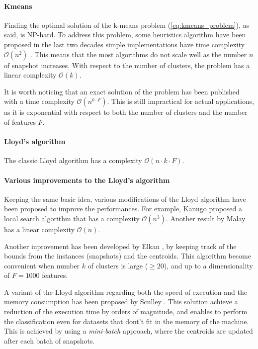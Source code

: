 \paragraph*{Kmeans}
Finding the optimal solution of the k-means problem (\autoref{eq:kmeans_problem}), as said, is NP-hard.
To address this problem, some heuristics algorithm have been proposed in the last two decades simple implementations have time complexity $\mathcal{O}(n^2)$ \cite{Kmeans_linear}.  This means that the most algorithms do not scale well as the number $n$ of snapshot increases. With respect to the number of clusters, the problem has a linear complexity $\mathcal{O}(k)$.

It is worth noticing that an exact solution of the problem has been published \cite{Kmeans_vornoi_japan} with a time complexity $\mathcal{O}(n^{k\cdot F})$. This is still impractical for actual applications, as it is exponential with respect to both the number of clusters and the number of features $F$.

\paragraph*{Lloyd's algorithm}
The classic Lloyd algorithm \cite{Lloyd1982} has a complexity $\mathcal{O}(n\cdot k\cdot F )$.

\paragraph*{Various improvements to the Lloyd's algorithm} Keeping the same basic idea, various modifications of the Lloyd algorithm have been proposed to improve the performances. For example, Kanugo \cite{kanungo2004local} proposed a local search algorithm that has a complexity $\mathcal{O}(n^3)$. Another result by Malay \cite{Kmeans_linear} has a linear complexity $\mathcal{O}(n)$. 

Another inprovement has been developed by Elkan \cite{kmeans-accelerated}, by keeping track of the bounds from the instances (snapshots) and the centroids. This algorithm become convenient when number $k$ of clusters is large ($\geq 20$), and up to a dimensionality of $F=1000$ features.

A variant of the Lloyd algorithm regarding both the speed of execution and the memory consumption has been proposed by Sculley \cite{Sculley2010}. This solution achieve a reduction of the execution time by orders of magnitude, and enables to perform the classification even for datasets that dont't fit in the memory of the machine. This is achieved by using a \emph{mini-batch} approach, where the centroids are updated after each batch of snapshots.

